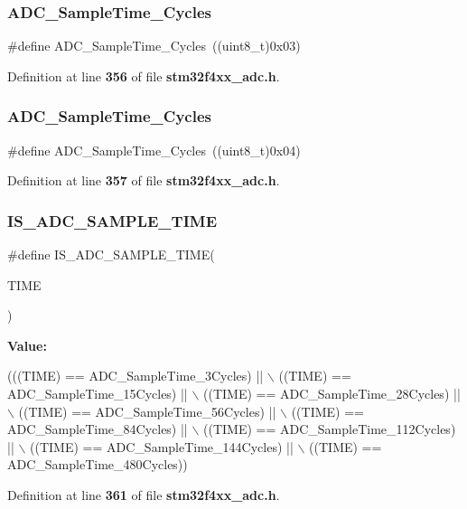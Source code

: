\subsubsection{A\+D\+C\+\_\+\+Sample\+Time\+\_\+Cycles}
{\footnotesize\ttfamily \#define A\+D\+C\+\_\+\+Sample\+Time\+\_\+Cycles~((uint8\+\_\+t)0x03)}



Definition at line \textbf{ 356} of file \textbf{ stm32f4xx\+\_\+adc.\+h}.

\mbox{\label{group__ADC__sampling__times_gae48f94881114c1f042fadb4322a9d1b2}} 
\subsubsection{A\+D\+C\+\_\+\+Sample\+Time\+\_\+Cycles}
{\footnotesize\ttfamily \#define A\+D\+C\+\_\+\+Sample\+Time\+\_\+Cycles~((uint8\+\_\+t)0x04)}



Definition at line \textbf{ 357} of file \textbf{ stm32f4xx\+\_\+adc.\+h}.

\mbox{\label{group__ADC__sampling__times_ga30e0307fa009e1c383d3047b48e94644}} 
\subsubsection{I\+S\+\_\+\+A\+D\+C\+\_\+\+S\+A\+M\+P\+L\+E\+\_\+\+T\+I\+ME}
{\footnotesize\ttfamily \#define I\+S\+\_\+\+A\+D\+C\+\_\+\+S\+A\+M\+P\+L\+E\+\_\+\+T\+I\+ME(\begin{DoxyParamCaption}\item[{}]{T\+I\+ME }\end{DoxyParamCaption})}

{\bfseries Value\+:}
\begin{DoxyCode}
(((TIME) == ADC_SampleTime_3Cycles) || \(\backslash\)
                                  ((TIME) == ADC_SampleTime_15Cycles) || \(\backslash\)
                                  ((TIME) == ADC_SampleTime_28Cycles) || \(\backslash\)
                                  ((TIME) == ADC_SampleTime_56Cycles) || \(\backslash\)
                                  ((TIME) == ADC_SampleTime_84Cycles) || \(\backslash\)
                                  ((TIME) == ADC_SampleTime_112Cycles) || \(\backslash\)
                                  ((TIME) == ADC_SampleTime_144Cycles) || \(\backslash\)
                                  ((TIME) == ADC_SampleTime_480Cycles))
\end{DoxyCode}


Definition at line \textbf{ 361} of file \textbf{ stm32f4xx\+\_\+adc.\+h}.

